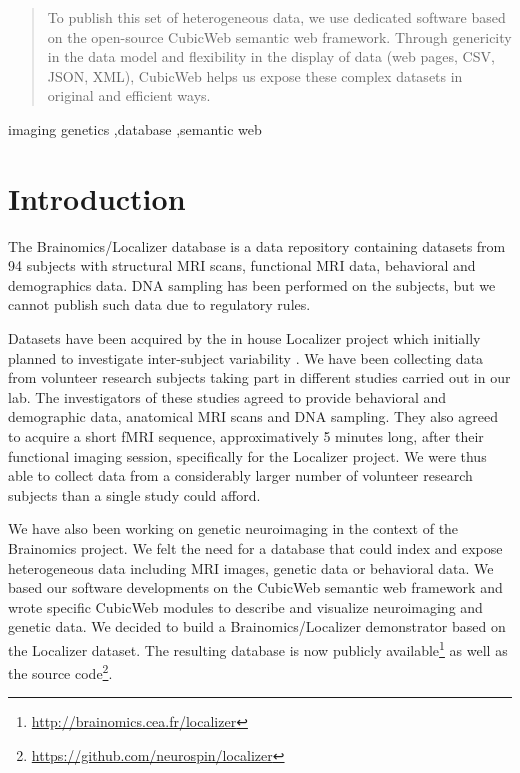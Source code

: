 \documentclass[preprint,12pt]{elsarticle}
\begin{document}
\begin{frontmatter}
\begin{abstract}
To publish this set of heterogeneous data, we use dedicated software based on the open-source CubicWeb semantic web framework. Through genericity in the data model and flexibility in the display of data (web pages, CSV, JSON, XML), CubicWeb helps us expose these complex datasets in original and efficient ways.
\end{abstract}

\begin{keyword}


imaging genetics \sep database \sep semantic web
\end{keyword}

\end{frontmatter}


\section{Introduction}

The Brainomics/Localizer database is a data repository containing datasets from 94 subjects with structural MRI scans, functional MRI data, behavioral and demographics data. DNA sampling has been performed on the subjects, but we cannot publish such data due to regulatory rules.

Datasets have been acquired by the in house Localizer project which initially planned to investigate inter-subject variability \cite{Pinel2007}. We have been collecting data from volunteer research subjects taking part in different studies carried out in our lab. The investigators of these studies agreed to provide behavioral and demographic data, anatomical MRI scans and DNA sampling. They also agreed to acquire a short fMRI sequence, approximatively 5 minutes long, after their functional imaging session, specifically for the Localizer project. We were thus able to collect data from a considerably larger number of volunteer research subjects than a single study could afford.

We have also been working on genetic neuroimaging in the context of the Brainomics project. We felt the need for a database that could index and expose heterogeneous data including MRI images, genetic data or behavioral data. We based our software developments on the CubicWeb semantic web framework and wrote specific CubicWeb modules to describe and visualize neuroimaging and genetic data. We decided to build a Brainomics/Localizer demonstrator based on the Localizer dataset. The resulting database is now publicly available\footnote{\url{http://brainomics.cea.fr/localizer}} as well as the source code\footnote{\url{https://github.com/neurospin/localizer}}.
\end{document}
